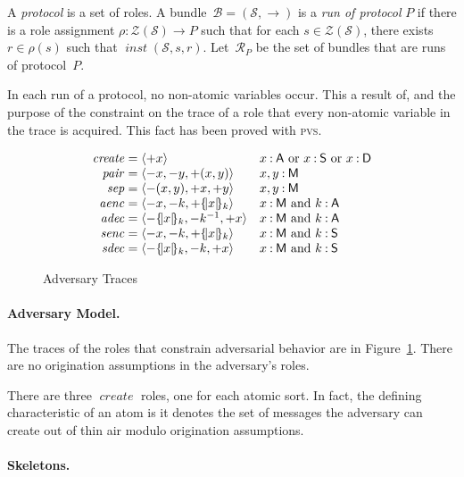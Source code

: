 \documentclass[12pt]{article}
\newcommand{\pvs}{\textsc{pvs}}
\newcommand{\fn}[1]{\ensuremath{\operatorname{\mathit{#1}}}}
\newcommand{\srt}[1]{\ensuremath{\mathsf{#1}}}
\newcommand{\typ}{\mathbin:}
\newcommand{\seq}[1]{\ensuremath{\langle#1\rangle}}
\newcommand{\enc}[2]{\ensuremath{\{\!|#1|\!\}_{#2}}}
\newcommand{\invk}[1]{{#1}^{-1}}
\newcommand{\inbnd}{\mathord -}
\newcommand{\outbnd}{\mathord +}
\newcommand{\ssp}{\ensuremath{\mathcal{S}}}
\newcommand{\bun}{\ensuremath{\mathcal{B}}}
\newcommand{\strands}{\ensuremath{\mathcal{Z}}}
\newcommand{\run}{\mathcal{R}}
\newcommand{\rl}{\ensuremath{\rho}}
\begin{document}
A \emph{protocol} is a set of roles.  A bundle~$\bun=(\ssp,\to)$ is a
\emph{run of protocol} $P$ if there is a role assignment
$\rl\typ\strands(\ssp)\to P$ such that for each $s\in\strands(\ssp)$,
there exists $r\in\rl(s)$ such that $\fn{inst}(\ssp,s,r)$.
Let~$\run_P$ be the set of bundles that are runs of protocol~$P$.

In each run of a protocol, no non-atomic variables occur.  This a
result of, and the purpose of the constraint on the trace of a role
that every non-atomic variable in the trace is acquired.  This fact
has been proved with {\pvs}.

\begin{figure}
$$\begin{array}{r@{{}={}}ll}
\fn{create}&\seq{\outbnd x}&
\mbox{$x\typ\srt{A}$ or $x\typ\srt{S}$ or $x\typ\srt{D}$}\\
\fn{pair}&
\seq{\inbnd x,\inbnd y,\outbnd (x,y)}&
x,y\typ\srt{M}\\
\fn{sep}&
\seq{\inbnd (x,y),\outbnd x,\outbnd y}&
x,y\typ\srt{M}\\
\fn{aenc}&
\seq{\inbnd x,\inbnd k,\outbnd \enc{x}{k}}&
\mbox{$x\typ\srt{M}$ and $k\typ\srt{A}$}\\
\fn{adec}&
\seq{\inbnd \enc{x}{k},\inbnd\invk{k},\outbnd x}&
\mbox{$x\typ\srt{M}$ and $k\typ\srt{A}$}\\
\fn{senc}&
\seq{\inbnd x,\inbnd k,\outbnd \enc{x}{k}}&
\mbox{$x\typ\srt{M}$ and $k\typ\srt{S}$}\\
\fn{sdec}&
\seq{\inbnd \enc{x}{k},\inbnd k,\outbnd x}&
\mbox{$x\typ\srt{M}$ and $k\typ\srt{S}$}
\end{array}$$
\caption{Adversary Traces}\label{fig:adversary}
\end{figure}

\paragraph{Adversary Model.}
The traces of the roles that constrain adversarial
behavior are in Figure~\ref{fig:adversary}.  There are no origination
assumptions in the adversary's roles.

There are three \fn{create} roles, one for each atomic sort.  In
fact, the defining characteristic of an atom is it denotes the set of
messages the adversary can create out of thin air modulo origination
assumptions.

\paragraph{Skeletons.}
\end{document}
